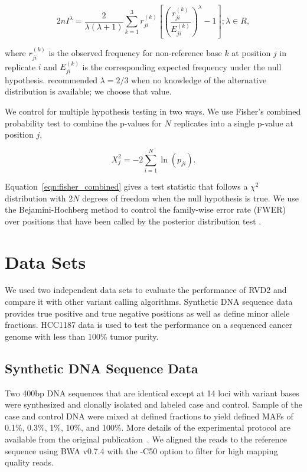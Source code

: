 \documentclass{bioinfo}
\begin{document}
\begin{equation}
 2nI^\lambda = \frac{2}{\lambda(\lambda+1)}\sum_{k=1}^3 r_{ji}^{(k)} \left[\left(\frac{r_{ji}^{(k)}}{E_{ji}^{(k)}}\right)^\lambda-1\right];\lambda \in R,
\end{equation}

where $r_{ji}^{(k)}$ is the observed frequency for non-reference base $k$ at position $j$ in replicate $i$ and $E_{ji}^{(k)}$ is the corresponding expected frequency under the null hypothesis. \citet{cressie1984multinomial} recommended $\lambda = 2/3$ when no knowledge of the alternative distribution is available; we choose that value.

We control for multiple hypothesis testing in two ways. We use Fisher's combined probability test \citep{fisher1970statistical} to combine the p-values for $N$ replicates into a single p-value at position $j$,

\begin{equation}\label{eqn:fisher_combined}
	X_j^2 = -2 \sum_{i=1}^N \ln(p_{ji}).
\end{equation}

Equation~\eqref{eqn:fisher_combined} gives a test statistic that follows a $\chi^2$ distribution with $2N$ degrees of freedom when the null hypothesis is true. We use the Bejamini-Hochberg method to control the family-wise error rate (FWER) over positions that have been called by the posterior distribution test \citep{benjamini1995controlling, efron2010large}.

\section{Data Sets}

We used two independent data sets to evaluate the performance of RVD2 and compare it with other variant calling algorithms. Synthetic DNA sequence data provides true positive and true negative positions as well as define minor allele fractions. HCC1187 data is used to test the performance on a sequenced cancer genome with less than 100\% tumor purity.

\subsection{Synthetic DNA Sequence Data}

Two 400bp DNA sequences that are identical except at 14 loci with variant bases were synthesized and clonally isolated and labeled case and control. Sample of the case and control DNA were mixed at defined fractions to yield defined MAFs of 0.1\%, 0.3\%, 1\%, 10\%, and 100\%. More details of the experimental protocol are available from the original publication~\citep{Flaherty:2011ja}. We aligned the reads to the reference sequence using BWA v0.7.4 with the -C50 option to filter for high mapping quality reads.
\end{document}
